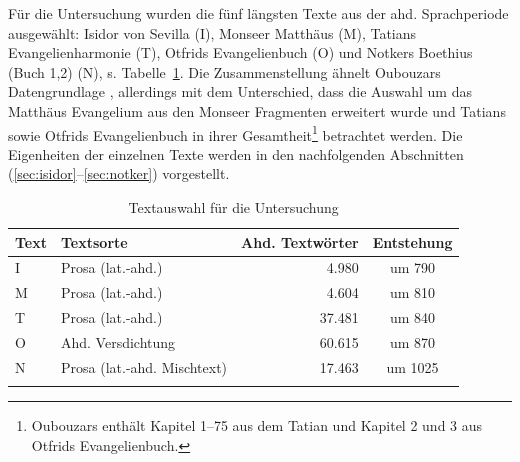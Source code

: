 Für die Untersuchung wurden die fünf längsten Texte aus der ahd. Sprachperiode ausgewählt: Isidor von Sevilla (I), Monseer Matthäus (M), Tatians Evangelienharmonie (T), Otfrids Evangelienbuch (O) und Notkers Boethius (Buch 1,2) (N), s. Tabelle~\ref{tab:ddd-auswahl}. Die Zusammenstellung ähnelt Oubouzars Datengrundlage \parencite[41--42]{Oubouzar1989}, allerdings mit dem Unterschied, dass die Auswahl um das Matthäus Evangelium aus den Monseer Fragmenten erweitert wurde und Tatians sowie Otfrids Evangelienbuch in ihrer Gesamtheit\footnote{Oubouzars  enthält Kapitel 1--75 aus dem Tatian und Kapitel 2 und 3 aus Otfrids Evangelienbuch.} betrachtet werden.  Die Eigenheiten der einzelnen Texte werden in den nachfolgenden Abschnitten (\ref{sec:isidor}--\ref{sec:notker}) vorgestellt.

\begin{table}[p]
\begin{tabular}{llrc}
\lsptoprule
Text                  & Textsorte      & Ahd. Textwörter & Entstehung \\ \midrule
I                      & Prosa (lat.-ahd.)          &   4.980                  & um 790       \\
M         & Prosa (lat.-ahd.)          & 4.604            & um 810              \\
T & Prosa (lat.-ahd.)          & 37.481                  & um 840              \\
O     & Ahd. Versdichtung          & 60.615               & um 870              \\
N   & Prosa (lat.-ahd. Mischtext) &  17.463               & um 1025             \\ \lspbottomrule
\end{tabular}
\caption{Textauswahl für die Untersuchung}
\label{tab:ddd-auswahl}
\end{table}

